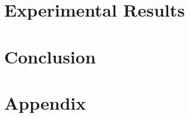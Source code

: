\documentclass{ecsthesis}       %
\begin{document}

\chapter{Experimental Results}\label{experimental-results}



\chapter{Conclusion}\label{conclusion}


\chapter{Appendix} \label{Chapter:Appendix}


\backmatter



\end{document}

